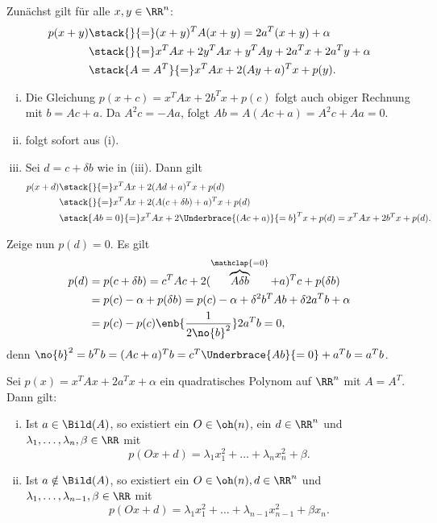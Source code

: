 \begin{beweis}
	Zunächst gilt für alle $x,y\in \RR^n$:
	\begin{align*}
		p(x+y) &\stack{}{=} (x+y)^T A (x+y) = 2a^T(x+y) + \alpha \\
		&\stack{}{=} x^T Ax + 2y^T Ax + y^T Ay + 2a^Tx + 2a^Ty + \alpha \\
		&\stack{A=A^T}{=} x^TAx + 2(Ay + a)^Tx + p(y).
	\end{align*}
	\begin{enumerate}[(i)]
		\item Die Gleichung $p(x+c) = x^TAx + 2b^Tx + p(c)$ folgt auch obiger Rechnung mit $b = Ac+a$.
		Da $A^2c = -Aa$, folgt $Ab = A(Ac + a) = A^2c + Aa = 0$.
		\item folgt sofort aus (i).
		\item Sei $d = c + \delta b$ wie in (iii).
		Dann gilt
		\begin{align*}
			p(x+d)& \stack{}{=} x^TAx + 2(Ad+a)^T x + p(d) \\
			&\stack{}{=} x^TAx + 2(A(c+\delta b) + a)^T x + p(d) \\
			&\stack{Ab=0}{=} x^TAx + 2\Underbrace{(Ac+a)}{=b}^Tx + p(d) = x^TAx + 2b^Tx + p(d).
		\end{align*}
	\end{enumerate}
	Zeige nun $p(d) = 0$.
	Es gilt
	\begin{align*}
		p(d) &= p(c+\delta b) = c^TAc + 2(\overbrace{A\delta b}^{\mathclap{=0}}+a)^T c + p(\delta b) \\
		&= p(c) - \alpha + p(\delta b) = p(c) - \alpha + \delta^2 b^TAb + \delta 2 a^T b + \alpha \\
		&= p(c) - p(c) \enb{\frac{1}{2 \no{b}^2}} 2a^Tb = 0,
	\end{align*}
	denn $\no{b}^2 = b^Tb = (Ac+a)^Tb = c^T\Underbrace{Ab}{=0} + a^Tb = a^Tb$. 
\end{beweis}

\begin{satz}
	\label{satz:8.5}
	Sei $p(x) = x^TAx + 2a^Tx + \alpha$ ein quadratisches Polynom auf $\RR^n$ mit $A = A^T$.
	Dann gilt:
	\begin{enumerate}[(i)]
		\item Ist $a \in \Bild(A)$, so existiert ein $O \in \oh(n)$, ein $d \in \RR^n$ und $\lambda_1,\dots,\lambda_n,\beta \in \RR$ mit
		\[
			p(Ox + d) = \lambda_1 x_1^2 + \dots + \lambda_n x_n^2 + \beta.
		\]
		\item Ist $a \notin \Bild(A)$, so existiert ein $O \in \oh(n), d \in \RR^n$ und $\lambda_1,\dots,\lambda_{n-1},\beta \in \RR$ mit
		\[
			p(Ox+d) = \lambda_1 x_1^2 + \dots + \lambda_{n-1} x_{n-1}^2 + \beta x_n.
		\]
	\end{enumerate}
\end{satz}

